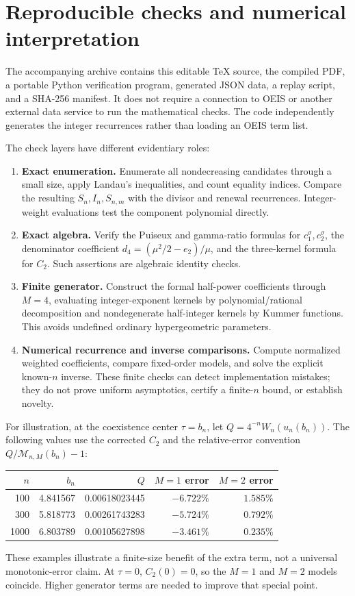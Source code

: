 \documentclass[11pt]{article}
\theoremstyle{remark}\newtheorem{remark}[theorem]{Remark}
\theoremstyle{definition}\newtheorem{definition}[theorem]{Definition}
\begin{document}
\section{Reproducible checks and numerical interpretation}
\label{tss:sec:checks}
The accompanying archive contains this editable \TeX{} source, the compiled PDF, a portable Python verification program, generated JSON data, a replay script, and a SHA-256 manifest. It does not require a connection to OEIS or another external data service to run the mathematical checks. The code independently generates the integer recurrences rather than loading an OEIS term list.

The check layers have different evidentiary roles:
\begin{enumerate}
\item \textbf{Exact enumeration.} Enumerate all nondecreasing candidates through a small size, apply Landau's inequalities, and count equality indices. Compare the resulting $S_n,I_n,S_{n,m}$ with the divisor and renewal recurrences. Integer-weight evaluations test the component polynomial directly.
\item \textbf{Exact algebra.} Verify the Puiseux and gamma-ratio formulas for $c_1^\sigma,c_2^\sigma$, the denominator coefficient $d_4=(\mu^2/2-e_2)/\mu$, and the three-kernel formula for $C_2$. Such assertions are algebraic identity checks.
\item \textbf{Finite generator.} Construct the formal half-power coefficients through $M=4$, evaluating integer-exponent kernels by polynomial/rational decomposition and nondegenerate half-integer kernels by Kummer functions. This avoids undefined ordinary hypergeometric parameters.
\item \textbf{Numerical recurrence and inverse comparisons.} Compute normalized weighted coefficients, compare fixed-order models, and solve the explicit known-$n$ inverse. These finite checks can detect implementation mistakes; they do not prove uniform asymptotics, certify a finite-$n$ bound, or establish novelty.
\end{enumerate}

For illustration, at the coexistence center $\tau=b_n$, let $Q=4^{-n}W_n(u_n(b_n))$. The following values use the corrected $C_2$ and the relative-error convention $Q/\mathcal M_{n,M}(b_n)-1$:
\begin{center}
\begin{tabular}{rrrrr}
\toprule
$n$&$b_n$&$Q$&$M=1$ error&$M=2$ error\\\midrule
100&4.841567&0.00618023445&$-6.722\%$&$1.585\%$\\
300&5.818773&0.00261743283&$-5.724\%$&$0.792\%$\\
1000&6.803789&0.00105627898&$-3.461\%$&$0.235\%$\\
\bottomrule
\end{tabular}
\end{center}
These examples illustrate a finite-size benefit of the extra term, not a universal monotonic-error claim. At $\tau=0$, $C_2(0)=0$, so the $M=1$ and $M=2$ models coincide. Higher generator terms are needed to improve that special point.
\end{document}
